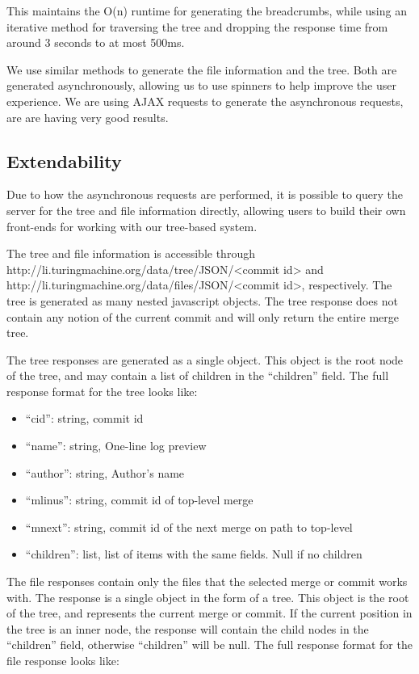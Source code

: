 \documentclass[conference, draftclsnofoot]{IEEEtran}
\begin{document}
This maintains the O(n) runtime for generating the breadcrumbs, while using an
iterative method for traversing the tree and dropping the response time from
around 3 seconds to at most 500ms.

We use similar methods to generate the file information and the tree. Both are
generated asynchronously, allowing us to use spinners to help improve the user
experience. We are using AJAX requests to generate the asynchronous requests,
are are having very good results.\newpage

\subsection{Extendability}
Due to how the asynchronous requests are performed, it is possible to query the
server for the tree and file information directly, allowing users to build
their own front-ends for working with our tree-based system.

The tree and file information is accessible through
http://li.turingmachine.org/data/tree/JSON/<commit id> and
http://li.turingmachine.org/data/files/JSON/<commit id>, respectively.
The tree is generated as many nested javascript objects. The tree response does
not contain any notion of the current commit and will only return the entire
merge tree.

The tree responses are generated as a single object. This object is the root
node of the tree, and may contain a list of children in the ``children'' field.
The full response format for the tree looks like:

\begin{itemize}
        \item ``cid'': string, commit id
        \item ``name'': string, One-line log preview
        \item ``author'': string, Author's name
        \item ``mlinus'': string, commit id of top-level merge
        \item ``mnext'': string, commit id of the next merge on path to
                top-level
        \item ``children'': list, list of items with the same fields. Null if
                no children
\end{itemize}

The file responses contain only the files that the selected merge or commit
works with. The response is a single object in the form of a tree. This object
is the root of the tree, and represents the current merge or commit. If the
current position in the tree is an inner node, the response will contain the
child nodes in the ``children'' field, otherwise ``children'' will be null. The
full response format for the file response looks like:
\end{document}
